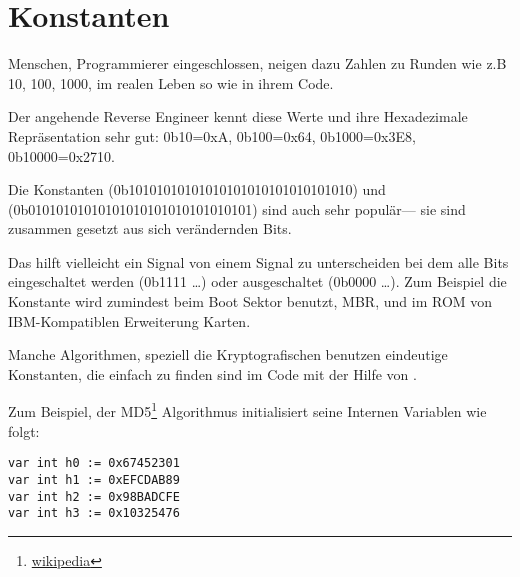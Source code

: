 \section{Konstanten}

Menschen, Programmierer eingeschlossen, neigen dazu Zahlen zu Runden wie z.B 10, 100, 1000,
im realen Leben so wie in ihrem Code.

Der angehende Reverse Engineer kennt diese Werte und ihre Hexadezimale Repräsentation sehr gut:
0b10=0xA, 0b100=0x64, 0b1000=0x3E8, 0b10000=0x2710.

Die Konstanten  (0b10101010101010101010101010101010) und 
 (0b01010101010101010101010101010101) sind auch sehr populär---
sie sind zusammen gesetzt aus sich verändernden Bits. %


Das hilft vielleicht ein Signal von einem Signal zu unterscheiden bei dem alle Bits eingeschaltet werden  (0b1111 \dots) oder ausgeschaltet (0b0000 \dots).
Zum Beispiel die  Konstante wird
zumindest beim Boot Sektor benutzt, \ac{MBR},
und im \ac{ROM} von IBM-Kompatiblen Erweiterung Karten.


Manche Algorithmen, speziell die Kryptografischen benutzen eindeutige Konstanten, die einfach zu finden 
sind im Code mit der Hilfe von \IDA.

\newcommand{\URLMD}{http://go.yurichev.com/17111}

Zum Beispiel, der MD5\footnote{\href{\URLMD}{wikipedia}} Algorithmus initialisiert seine Internen Variablen wie folgt:

\begin{verbatim}
var int h0 := 0x67452301
var int h1 := 0xEFCDAB89
var int h2 := 0x98BADCFE
var int h3 := 0x10325476
\end{verbatim}

